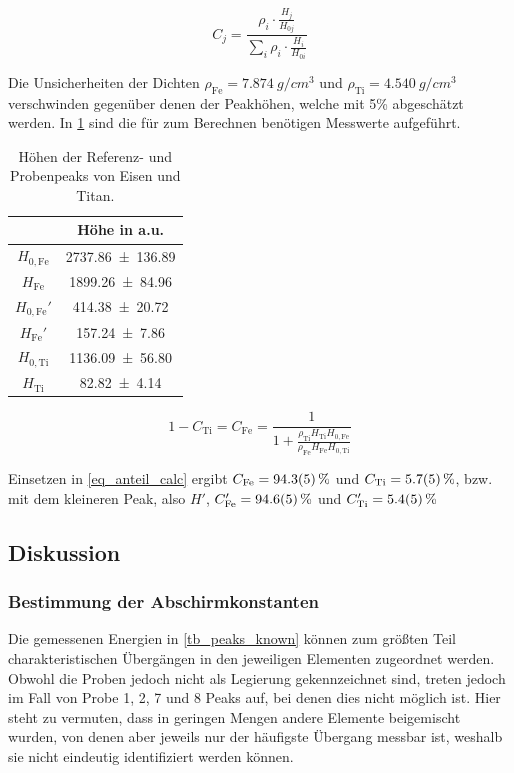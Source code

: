 \documentclass[
	a4paper,
	12pt,
	pagesize,
	ngerman
]{scrartcl}
\begin{document}
	\begin{equation}
		\label{eq_anteil}
		C_j = \frac{\rho_i \cdot \frac{H_j}{H_{0j}}}{\sum_{i} \rho_i \cdot \frac{H_i}{H_{0i}}}
	\end{equation}

	Die Unsicherheiten der Dichten $\rho_\text{Fe}=\SI{7.874}{g/cm^3}$ und $\rho_\text{Ti}=\SI{4.540}{g/cm^3}$ verschwinden gegenüber denen der Peakhöhen, welche mit 5\% abgeschätzt werden. \cite{density}
	In \cref{tb_peaks} sind die für zum Berechnen benötigen Messwerte aufgeführt.

	\begin{table}[H]
		\centering
		\begin{tabular}{ c | c }
			 & Höhe in a.u.\\ \hline \hline
			$H_{0 , \text{Fe}}$ & \SI{2737.86+-136.89}{} \\
			$H_{\text{Fe}}$ & \SI{1899.26+-84.96}{} \\
			$H_{0 , \text{Fe}}'$ & \SI{414.38+-20.72}{} \\
			$H_{\text{Fe}}'$ & \SI{157.24+-7.86}{} \\
			$H_{0 , \text{Ti}}$ & \SI{1136.09+-56.80}{} \\
			$H_{\text{Ti}}$ & \SI{82.82+-4.14}{} \\
		\end{tabular}
		\caption{Höhen der Referenz- und Probenpeaks von Eisen und Titan.} %
		\label{tb_peaks}
	\end{table}

	\begin{equation}
		\label{eq_anteil_calc}
		1-C_\text{Ti}= C_\text{Fe} = \frac{1}{1+ \frac{\rho_\text{Ti} H_\text{Ti} H_{0,\text{Fe}}}{\rho_\text{Fe} H_\text{Fe} H_{0,\text{Ti}}}}
	\end{equation}

	Einsetzen in \cref{eq_anteil_calc} ergibt $C_\text{Fe}=\SI{94.3+-0.5}{\%}$ und $C_\text{Ti}=\SI{5.7+-0.5}{\%}$, bzw. mit dem kleineren Peak, also $H'$, $C_\text{Fe}'=\SI{94.6+-0.5}{\%}$ und $C_\text{Ti}'=\SI{5.4+-0.5}{\%}$

	\subsection{Diskussion}
	\subsubsection{Bestimmung der Abschirmkonstanten}
	Die gemessenen Energien in \cref{tb_peaks_known} können zum größten Teil charakteristischen Übergängen in den jeweiligen Elementen zugeordnet werden.
	Obwohl die Proben jedoch nicht als Legierung gekennzeichnet sind, treten jedoch im Fall von Probe 1, 2, 7 und 8 Peaks auf, bei denen dies nicht möglich ist.
	Hier steht zu vermuten, dass in geringen Mengen andere Elemente beigemischt wurden, von denen aber jeweils nur der häufigste Übergang messbar ist, weshalb sie nicht eindeutig identifiziert werden können.
\end{document}
